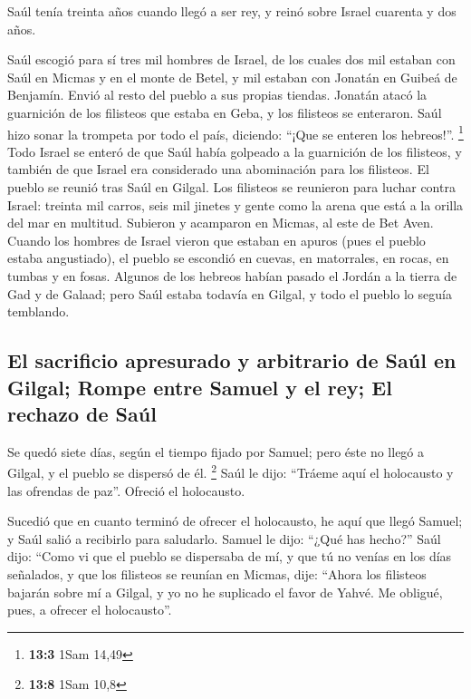  Saúl tenía treinta años cuando llegó a ser rey, y reinó
sobre Israel cuarenta y dos años.

 Saúl escogió para sí tres mil hombres de Israel, de los
cuales dos mil estaban con Saúl en Micmas y en el monte de Betel, y mil
estaban con Jonatán en Guibeá de Benjamín. Envió al resto del pueblo a
sus propias tiendas.  Jonatán atacó la guarnición de los
filisteos que estaba en Geba, y los filisteos se enteraron. Saúl hizo
sonar la trompeta por todo el país, diciendo: ``¡Que se enteren los
hebreos!''. \footnote{\textbf{13:3} 1Sam 14,49}  Todo
Israel se enteró de que Saúl había golpeado a la guarnición de los
filisteos, y también de que Israel era considerado una abominación para
los filisteos. El pueblo se reunió tras Saúl en Gilgal. 
Los filisteos se reunieron para luchar contra Israel: treinta mil
carros, seis mil jinetes y gente como la arena que está a la orilla del
mar en multitud. Subieron y acamparon en Micmas, al este de Bet Aven.
 Cuando los hombres de Israel vieron que estaban en apuros
(pues el pueblo estaba angustiado), el pueblo se escondió en cuevas, en
matorrales, en rocas, en tumbas y en fosas.  Algunos de
los hebreos habían pasado el Jordán a la tierra de Gad y de Galaad; pero
Saúl estaba todavía en Gilgal, y todo el pueblo lo seguía temblando.

\hypertarget{el-sacrificio-apresurado-y-arbitrario-de-sauxfal-en-gilgal-rompe-entre-samuel-y-el-rey-el-rechazo-de-sauxfal}{%
\subsection{El sacrificio apresurado y arbitrario de Saúl en Gilgal;
Rompe entre Samuel y el rey; El rechazo de
Saúl}\label{el-sacrificio-apresurado-y-arbitrario-de-sauxfal-en-gilgal-rompe-entre-samuel-y-el-rey-el-rechazo-de-sauxfal}}

 Se quedó siete días, según el tiempo fijado por Samuel;
pero éste no llegó a Gilgal, y el pueblo se dispersó de él. \footnote{\textbf{13:8}
  1Sam 10,8}  Saúl le dijo: ``Tráeme aquí el holocausto y
las ofrendas de paz''. Ofreció el holocausto.

 Sucedió que en cuanto terminó de ofrecer el holocausto,
he aquí que llegó Samuel; y Saúl salió a recibirlo para saludarlo.
 Samuel le dijo: ``¿Qué has hecho?'' Saúl dijo: ``Como vi
que el pueblo se dispersaba de mí, y que tú no venías en los días
señalados, y que los filisteos se reunían en Micmas, 
dije: ``Ahora los filisteos bajarán sobre mí a Gilgal, y yo no he
suplicado el favor de Yahvé. Me obligué, pues, a ofrecer el
holocausto''.


